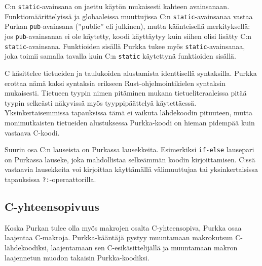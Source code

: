 C:n \texttt{static}-avainsana on jaettu käytön mukaisesti kahteen avainsanaan.
Funktiomäärittelyissä ja globaaleissa muuttujissa C:n
\texttt{static}-avainsanaa vastaa Purkan \texttt{pub}-avainsana (''public'' eli
julkinen), mutta käänteisellä merkityksellä: jos \texttt{pub}-avainsanaa ei ole
käytetty, koodi käyttäytyy kuin siihen olisi lisätty C:n
\texttt{static}-avainsana. Funktioiden sisällä Purkka tukee myös
\texttt{static}-avainsanaa, joka toimii samalla tavalla kuin C:n
\texttt{static} käytettynä funktioiden sisällä.

C käsittelee tietueiden ja taulukoiden alustamista identtisellä syntaksilla.
Purkka erottaa nämä kaksi syntaksia erikseen Rust-ohjelmointikielen
syntaksin mukaisesti.
Tietueen tyypin nimen pitäminen mukana
tietueliteraaleissa pitää tyypin selkeästi näkyvissä myös tyyppipäättelyä
käytettäessä. Yksinkertaisemmissa tapauksissa tämä ei vaikuta lähdekoodin
pituuteen, mutta monimutkaisten tietueiden alustuksessa Purkka-koodi on hieman
pidempää kuin vastaava C-koodi.


Suurin osa C:n lauseista on Purkassa lausekkeita. Esimerkiksi \texttt{if-else}
lausepari on Purkassa lauseke, joka mahdollistaa selkeämmän koodin
kirjoittamisen. C:ssä vastaavia lausekkeita voi kirjoittaa käyttämällä
välimuuttujaa tai yksinkertaisissa tapauksissa \texttt{?:}-operaattorilla.

\subsection{C-yhteensopivuus}

Koska Purkan tulee olla myös makrojen osalta C-yhteensopiva, Purkka osaa
laajentaa C-makroja. Purkka-kääntäjä pystyy muuntamaan makrokutsun
C-lähdekoodiksi, laajentamaan sen C-esikäsittelijällä ja muuntamaan makron
laajennetun muodon takaisin Purkka-koodiksi.


